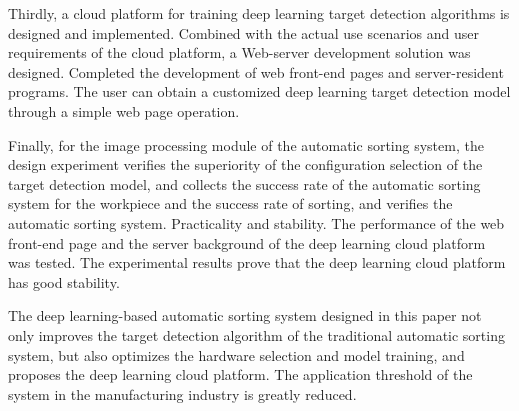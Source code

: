 \begin{englishabstract}
Thirdly, a cloud platform for training deep learning target detection algorithms is designed and implemented. 
Combined with the actual use scenarios and user requirements of the cloud platform, a Web-server development solution was designed. 
Completed the development of web front-end pages and server-resident programs. 
The user can obtain a customized deep learning target detection model through a simple web page operation.

Finally, for the image processing module of the automatic sorting system, 
the design experiment verifies the superiority of the configuration selection of the target detection model, 
and collects the success rate of the automatic sorting system for the workpiece and the success rate of sorting, 
and verifies the automatic sorting system. Practicality and stability. The performance of the web front-end page and the server 
background of the deep learning cloud platform was tested. The experimental results prove that the deep learning cloud platform has good stability.

The deep learning-based automatic sorting system designed in this paper not only improves the target detection algorithm of the traditional automatic 
sorting system, but also optimizes the hardware selection and model training, and proposes the deep learning cloud platform. 
The application threshold of the system in the manufacturing industry is greatly reduced.


\end{englishabstract}

